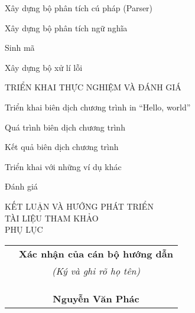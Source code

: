 \documentclass[11pt,a4paper]{article}
\begin{document}
\begin{mucluc}
\begin{mucluc}
            \item Xây dựng bộ phân tích cú pháp (Parser)
            \item Xây dựng bộ phân tích ngữ nghĩa
            \item Sinh mã
            \item Xây dựng bộ xử lí lỗi
        \end{mucluc}
        \item TRIỂN KHAI THỰC NGHIỆM VÀ ĐÁNH GIÁ
        \begin{mucluc}
            \item Triển khai biên dịch chương trình in “Hello, world”
            \begin{mucluc}
                \item Quá trình biên dịch chương trình 
                \item Kết quả biên dịch chương trình
            \end{mucluc}
            \item Triển khai với những ví dụ khác
            \item Đánh giá
        \end{mucluc}
    \end{mucluc}

    \noindent 
    \vspace{5pt}KẾT LUẬN VÀ HƯỚNG PHÁT TRIỂN\\\vspace{5pt}TÀI LIỆU THAM KHẢO\\PHỤ LỤC
    
    \vspace{1cm}
    \fontsize{12}{0} 
    \begin{tabular}{ m{8cm} c }
        & \textbf{Xác nhận của cán bộ hướng dẫn}\\
        & \textit{(Ký và ghi rõ họ tên)}\\
        &\\ &\\ &\\ 
        & \textbf{Nguyễn Văn Phác}
    \end{tabular}
\end{document}
